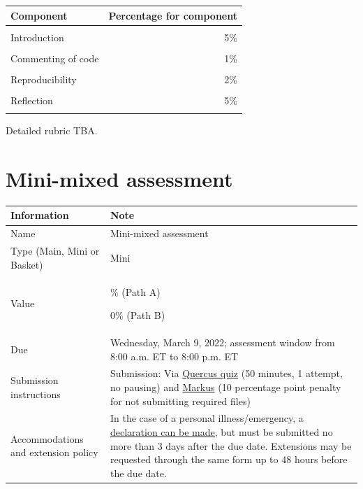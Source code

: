 \documentclass[
  openany]{book}
\newcommand{\blandscape}{\begin{landscape}}
\newcommand{\elandscape}{\end{landscape}}
\begin{document}
\begin{table}[H]
\centering\begingroup\fontsize{12}{14}\selectfont

\begin{tabular}{lr}
\toprule
Component & Percentage for component\\
\midrule
\cellcolor{gray!6}{Cover page} & \cellcolor{gray!6}{1\%}\\
Introduction & 5\%\\
\cellcolor{gray!6}{Statistical skills sample} & \cellcolor{gray!6}{60\%}\\
Commenting of code & 1\%\\
\cellcolor{gray!6}{Readability of R code} & \cellcolor{gray!6}{1\%}\\
\addlinespace
Reproducibility & 2\%\\
\cellcolor{gray!6}{Writing sample} & \cellcolor{gray!6}{20\%}\\
Reflection & 5\%\\
\cellcolor{gray!6}{General (multiple components)} & \cellcolor{gray!6}{5\%}\\
\bottomrule
\end{tabular}
\endgroup{}
\end{table}

Detailed rubric TBA.

\newpage
\blandscape

\elandscape

\hypertarget{mini-mixed-assessment}{%
\chapter{Mini-mixed assessment}\label{mini-mixed-assessment}}

\begin{longtable}[]{@{}
  >{\raggedright\arraybackslash}p{}
  >{\raggedright\arraybackslash}p{}@{}}
\toprule
Information & Note \\
\midrule
\endhead
Name & Mini-mixed assessment \\
Type (Main, Mini or Basket) & Mini \\
Value & 5\% (Path A)

0\% (Path B) \\
Due & Wednesday, March 9, 2022; assessment window from 8:00 a.m. ET to 8:00 p.m. ET \\
Submission instructions & Submission: Via \href{https://q.utoronto.ca/courses/253305/quizzes/237353}{Quercus quiz} (50 minutes, 1 attempt, no pausing) and \href{https://markus-ds.teach.cs.toronto.edu/}{Markus} (10 percentage point penalty for not submitting required files) \\
Accommodations and extension policy & In the case of a personal illness/emergency, a \href{https://forms.office.com/Pages/ResponsePage.aspx?id=JsKqeAMvTUuQN7RtVsVSEOKHUU3SzAJJhmOKjJhDWEpUNTFDSzhZTFlXUzVYMVlNM1FEUTRZMkVWOC4u}{declaration can be made,} but must be submitted no more than 3 days after the due date. Extensions may be requested through the same form up to 48 hours before the due date. \\
\bottomrule
\end{longtable}
\end{document}
